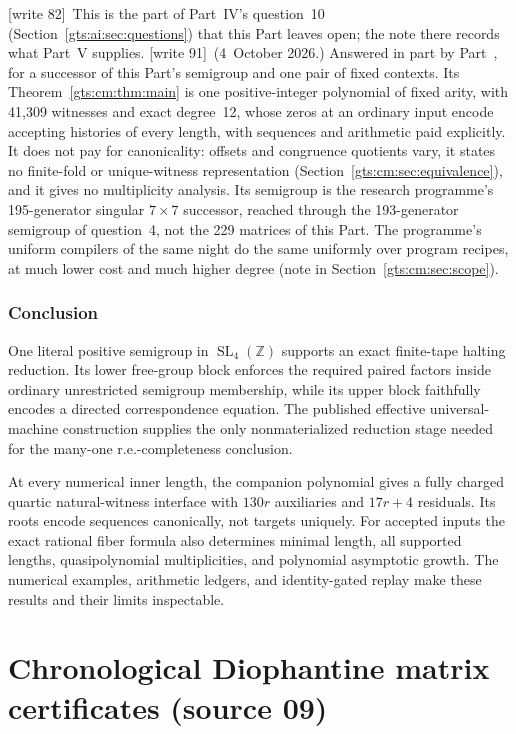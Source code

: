 \documentclass[11pt,letterpaper]{article}
\theoremstyle{definition}
\theoremstyle{remark}
\newcommand{\Z}{\mathbb Z}
\newcommand{\SL}{\operatorname{SL}}
\newcounter{umsaveeq}
\newcounter{cmsaveeq}
\newcommand{\wtagc}{\textup{[write 82]}}
\newcommand{\wtagd}{\textup{[write 91]}}
\begin{document}
\begin{enumerate}
\wtagc\ This is the part of Part~IV's question~10 (Section~\ref{gts:ai:sec:questions}) that this Part leaves open; the note there records what Part~V supplies.
\wtagd\ (4~October 2026.) Answered in part by Part~\ref{gts:part:cm}, for a successor of this Part's semigroup and one pair of fixed contexts. Its Theorem~\ref{gts:cm:thm:main} is one positive-integer polynomial of fixed arity, with 41,309 witnesses and exact degree~12, whose zeros at an ordinary input encode accepting histories of every length, with sequences and arithmetic paid explicitly. It does not pay for canonicality: offsets and congruence quotients vary, it states no finite-fold or unique-witness representation (Section~\ref{gts:cm:sec:equivalence}), and it gives no multiplicity analysis. Its semigroup is the research programme's 195-generator singular $7\times7$ successor, reached through the 193-generator semigroup of question~4, not the 229 matrices of this Part. The programme's uniform compilers of the same night do the same uniformly over program recipes, at much lower cost and much higher degree (note in Section~\ref{gts:cm:sec:scope}).
\end{enumerate}

\section{Conclusion}
One literal positive semigroup in $\SL_4(\Z)$ supports an exact finite-tape halting reduction. Its lower free-group block enforces the required paired factors inside ordinary unrestricted semigroup membership, while its upper block faithfully encodes a directed correspondence equation. The published effective universal-machine construction supplies the only nonmaterialized reduction stage needed for the many-one r.e.-completeness conclusion.

At every numerical inner length, the companion polynomial gives a fully charged quartic natural-witness interface with $130r$ auxiliaries and $17r+4$ residuals. Its roots encode sequences canonically, not targets uniquely. For accepted inputs the exact rational fiber formula also determines minimal length, all supported lengths, quasipolynomial multiplicities, and polynomial asymptotic growth. The numerical examples, arithmetic ledgers, and identity-gated replay make these results and their limits inspectable.

\setcounter{equation}{\value{umsaveeq}}%
\let\theequation\umoldtheequation\let\theHequation\umoldtheHequation

\part{Chronological Diophantine matrix certificates (source 09)}\label{gts:part:cm}
\setcounter{cmsaveeq}{\value{equation}}\setcounter{equation}{0}%
\let\cmoldtheequation\theequation\let\cmoldtheHequation\theHequation
\renewcommand{\theequation}{VI.\arabic{equation}}\renewcommand{\theHequation}{cm.\arabic{equation}}%
\end{document}
